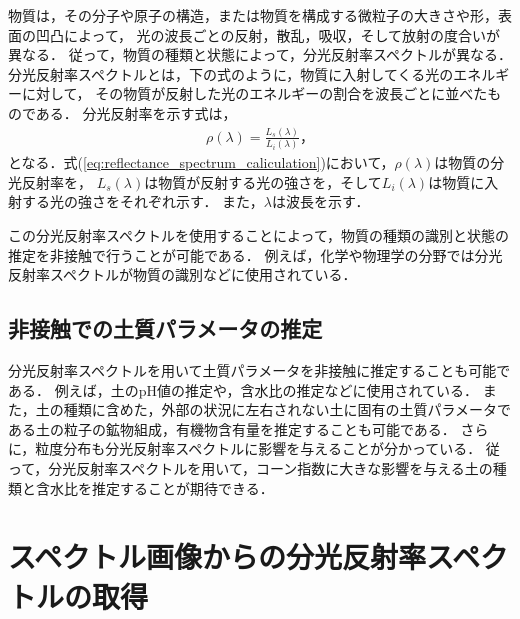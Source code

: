 物質は，その分子や原子の構造，または物質を構成する微粒子の大きさや形，表面の凹凸によって，
光の波長ごとの反射，散乱，吸収，そして放射の度合いが異なる\cite{Shaw2002}\cite{Shaw2003}．
従って，物質の種類と状態によって，分光反射率スペクトルが異なる．
分光反射率スペクトルとは，下の式のように，物質に入射してくる光のエネルギーに対して，
その物質が反射した光のエネルギーの割合を波長ごとに並べたものである．%
分光反射率を示す式は，
\begin{eqnarray}
\rho(\lambda) = \frac{L_s(\lambda)}{L_i(\lambda)}，\label{eq:reflectance_spectrum_caliculation}
\end{eqnarray}
となる．\mbox{式(\ref{eq:reflectance_spectrum_caliculation})}において，$\rho(\lambda)$は物質の分光反射率を，
$L_s(\lambda)$は物質が反射する光の強さを，そして$L_i(\lambda)$は物質に入射する光の強さをそれぞれ示す．
また，$\lambda$は波長を示す．%

この分光反射率スペクトルを使用することによって，物質の種類の識別と状態の推定を非接触で行うことが可能である．
例えば，化学や物理学の分野では分光反射率スペクトルが物質の識別などに使用されている\cite{長田2004}．


\subsection{非接触での土質パラメータの推定}
\label{ssec:NonContactEstimation}

分光反射率スペクトルを用いて土質パラメータを非接触に推定することも可能である．
例えば，土のpH値の推定や，含水比の推定などに使用されている\cite{Ben-Dor2002}\cite{Rossel2006}．%
また，土の種類に含めた，外部の状況に左右されない土に固有の土質パラメータである土の粒子の鉱物組成，有機物含有量を推定することも可能である\cite{Ben-Dor1995}\cite{Janik1998}．
さらに，粒度分布も分光反射率スペクトルに影響を与えることが分かっている\cite{小嶋1996}．
従って，分光反射率スペクトルを用いて，コーン指数に大きな影響を与える土の種類と含水比を推定することが期待できる\cite{小川1989}\cite{Jia2017}．

\clearpage

\section{スペクトル画像からの分光反射率スペクトルの取得}
\label{sec:SpectrumFromSpectralImage}

